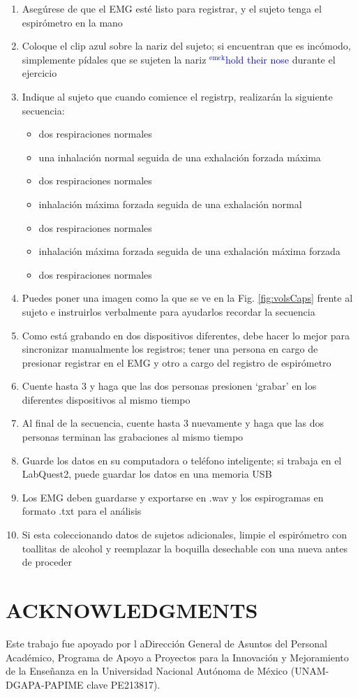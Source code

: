 \documentclass[12pt]{article}
\newcommand{\emck}[1]{\textcolor{blue}{$^{\textrm{emck}}${#1}}}
\begin{document}
\begin{enumerate}
\item Asegúrese de que el EMG esté listo para registrar, y el sujeto
  tenga el espirómetro en la mano
\item Coloque el clip azul sobre la nariz del sujeto; si encuentran
  que es incómodo, simplemente pídales que se sujeten la nariz
  \emck{hold their nose} durante el ejercicio
\item Indique al sujeto que cuando comience el registrp, 
realizarán la siguiente secuencia:
\begin{itemize}
\item dos respiraciones normales
\item una inhalación normal seguida de una exhalación forzada máxima
\item dos respiraciones normales
\item inhalación máxima forzada seguida de una exhalación normal
\item dos respiraciones normales
\item inhalación máxima forzada seguida de una exhalación máxima forzada
\item dos respiraciones normales
\end{itemize}
\item Puedes poner una imagen como la que se ve en la
  Fig. \ref{fig:volsCaps} frente al sujeto e instruirlos
  verbalmente para ayudarlos recordar la secuencia
\item Como está grabando en dos dispositivos diferentes, debe hacer lo
  mejor para sincronizar manualmente los registros; tener una persona
  en cargo de presionar registrar en el EMG y otro a cargo del
  registro de espirómetro
\item Cuente hasta 3 y haga que las dos personas presionen `grabar' en
  los diferentes dispositivos al mismo tiempo
\item Al final de la secuencia, cuente hasta 3 nuevamente y haga que las
  dos personas terminan las grabaciones al mismo tiempo
\item Guarde los datos en su computadora o teléfono inteligente; si
  trabaja en el LabQuest2, puede guardar los datos en una memoria
  USB
\item Los EMG deben guardarse y exportarse en .wav y los espirogramas en
  formato .txt para el análisis
\item Si esta coleccionando datos de sujetos adicionales, limpie el
  espirómetro con toallitas de alcohol y reemplazar la boquilla
  desechable con una nueva antes de proceder
\end{enumerate}

\section*{ACKNOWLEDGMENTS}
Este trabajo fue apoyado por l aDirección General de Asuntos del
Personal Académico, Programa de Apoyo a Proyectos para la Innovación y
Mejoramiento de la Enseñanza en la Universidad Nacional Autónoma de
México (UNAM-DGAPA-PAPIME clave PE213817).
 
\begin{small}

\end{small}
\end{document}
